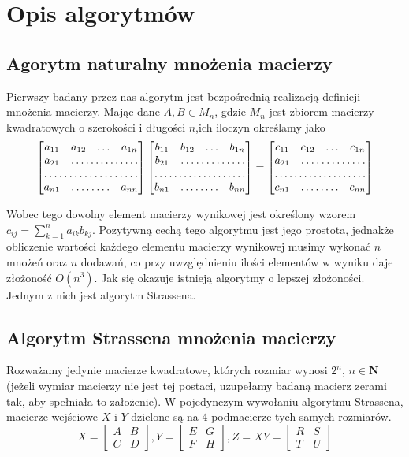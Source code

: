 \section{Opis algorytmów}
\subsection{Agorytm naturalny mnożenia macierzy}
Pierwszy badany przez nas algorytm jest bezpośrednią realizacją definicji mnożenia macierzy. Mając dane $A,B \in M_{n}$, gdzie $M_{n}$ jest zbiorem macierzy kwadratowych o szerokości i długości $n$,ich iloczyn określamy jako
$$ \begin{bmatrix}
a_{11} & a_{12} & \ldots & a_{1n} \\
a_{21} & \hdotsfor{3} \\
\hdotsfor{4}\\
a_{n1} & \hdotsfor{2} & a_{nn} \end{bmatrix}
\begin{bmatrix}
b_{11} & b_{12} & \ldots & b_{1n} \\
b_{21} & \hdotsfor{3} \\
\hdotsfor{4}\\
b_{n1} & \hdotsfor{2} & b_{nn} \end{bmatrix}=
\begin{bmatrix}
c_{11} & c_{12} & \ldots & c_{1n} \\
a_{21} & \hdotsfor{3} \\
\hdotsfor{4}\\
c_{n1} & \hdotsfor{2} & c_{nn} \end{bmatrix}
$$

Wobec tego dowolny element macierzy wynikowej jest określony wzorem $c_{ij}=\sum_{k=1}^{n} a_{ik}b_{kj}$. 
Pozytywną cechą tego algorytmu jest jego prostota, jednakże obliczenie wartości każdego elementu macierzy wynikowej musimy wykonać $n$ mnożeń oraz $n$ dodawań, co przy uwzględnieniu ilości elementów w wyniku daje złożoność $O(n^3)$. Jak się okazuje istnieją algorytmy o lepszej złożoności. Jednym z nich jest algorytm Strassena.
\subsection{Algorytm Strassena mnożenia macierzy}
Rozważamy jedynie macierze kwadratowe, których rozmiar wynosi $2^n$, $n \in \mathbf{N}$ (jeżeli wymiar macierzy nie jest tej postaci, uzupełamy badaną macierz zerami tak, aby spełniała to założenie). W pojedynczym wywołaniu algorytmu Strassena, macierze wejściowe $X$ i $Y$ dzielone są na 4 podmacierze tych samych rozmiarów.
$$X=\begin{bmatrix} A & B \\ C & D \end{bmatrix},	
Y=\begin{bmatrix} E & G \\ F & H \end{bmatrix},		
Z=XY=\begin{bmatrix} R & S \\ T & U \end{bmatrix}$$
